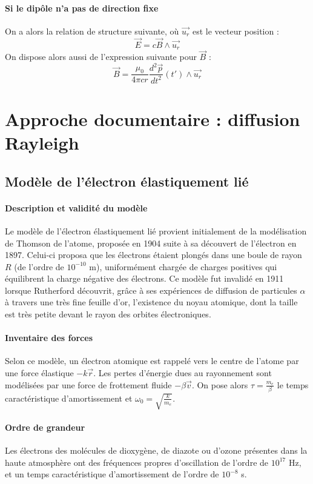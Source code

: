 \documentclass[french]{book}
\theoremstyle{plain}
\theoremstyle{definition}
\theoremstyle{remark}
\begin{document}
\paragraph{Si le dipôle n'a pas de direction fixe} On a alors la relation de structure suivante, où $\overrightarrow{u_r}$ est le vecteur position : $$\overrightarrow{E}=c\overrightarrow{B}\wedge\overrightarrow{u_r}$$ On dispose alors aussi de l'expression suivante pour $\overrightarrow{B}$ : $$\overrightarrow{B}=\frac{\mu_0}{4\pi cr}\frac{d^2\overrightarrow{p}}{dt^2}(t')\wedge\overrightarrow{u_r}$$ 
\section{Approche documentaire : diffusion Rayleigh}
\subsection{Modèle de l'électron élastiquement lié}
\paragraph{Description et validité du modèle}Le modèle de l'électron élastiquement lié provient initialement de la modélisation de Thomson de l'atome, proposée en 1904 suite à sa découvert de l'électron en 1897. Celui-ci proposa que les électrons étaient plongés dans une boule de rayon $R$ (de l'ordre de $10^{-10}$ m), uniformément chargée de charges positives qui équilibrent la charge négative des électrons. Ce modèle fut invalidé en 1911 lorsque Rutherford découvrit, grâce à ses expériences de diffusion de particules $\alpha$ à travers une très fine feuille d'or, l'existence du noyau atomique, dont la taille est très petite devant le rayon des orbites électroniques.
\paragraph{Inventaire des forces}Selon ce modèle, un électron atomique est rappelé vers le centre de l'atome par une force élastique $-k\overrightarrow{r}$. Les pertes d'énergie dues au rayonnement sont modélisées par une force de frottement fluide $-\beta\overrightarrow{v}$. On pose alors $\tau=\displaystyle\frac{m_e}{\beta}$ le temps caractéristique d'amortissement et $\omega_0=\displaystyle\sqrt{\frac{k}{m_e}}$.
\paragraph{Ordre de grandeur} Les électrons des molécules de dioxygène, de diazote ou d'ozone présentes dans la haute atmosphère ont des fréquences propres d'oscillation de l'ordre de $10^{17}$ Hz, et un temps caractéristique d'amortissement de l'ordre de $10^{-8}$ s.
\end{document}
